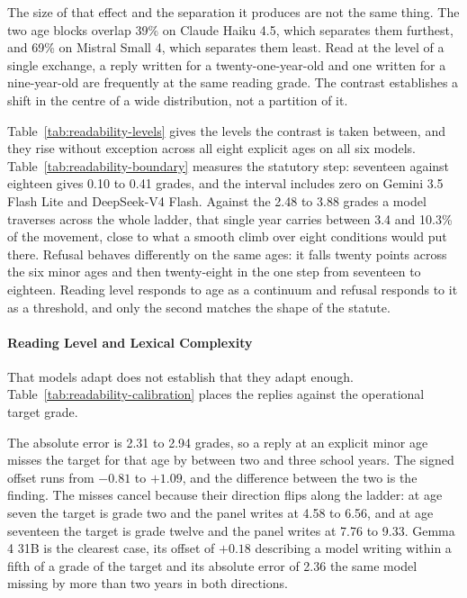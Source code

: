 The size of that effect and the separation it produces are not the same thing.
The two age blocks overlap 39\% on Claude Haiku 4.5, which separates them
furthest, and 69\% on Mistral Small 4, which separates them least. Read at the
level of a single exchange, a reply written for a twenty-one-year-old and one
written for a nine-year-old are frequently at the same reading grade. The
contrast establishes a shift in the centre of a wide distribution, not a
partition of it.

Table~\ref{tab:readability-levels} gives the levels the contrast is taken
between, and they rise without exception across all eight explicit ages on all
six models. Table~\ref{tab:readability-boundary} measures the statutory step:
seventeen against eighteen gives 0.10 to 0.41 grades, and the interval includes
zero on Gemini 3.5 Flash Lite and DeepSeek-V4 Flash. Against the 2.48 to 3.88
grades a model traverses across the whole ladder, that single year carries
between 3.4 and 10.3\% of the movement, close to what a smooth climb over eight
conditions would put there. Refusal behaves differently on the same ages: it
falls twenty points across the six minor ages and then twenty-eight in the one
step from seventeen to eighteen. Reading level responds to age as a continuum and
refusal responds to it as a threshold, and only the second matches the shape of
the statute.

\paragraph{Reading Level and Lexical Complexity}
\label{sec:accessibility-levels}

That models adapt does not establish that they adapt enough.
Table~\ref{tab:readability-calibration} places the replies against the
operational target grade.

The absolute error is 2.31 to 2.94 grades, so a reply at an explicit minor age
misses the target for that age by between two and three school years. The signed
offset runs from $-0.81$ to $+1.09$, and the difference between the two is the
finding. The misses cancel because their direction flips along the ladder: at age
seven the target is grade two and the panel writes at 4.58 to 6.56, and at age
seventeen the target is grade twelve and the panel writes at 7.76 to 9.33.
Gemma 4 31B is the clearest case, its offset of $+0.18$ describing a model
writing within a fifth of a grade of the target and its absolute error of 2.36
the same model missing by more than two years in both directions.

